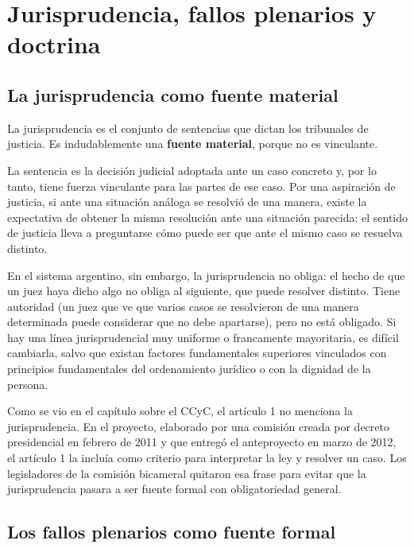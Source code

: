 \documentclass[12pt,oneside]{book}
\begin{document}
\chapter[Jurisprudencia, plenarios y doctrina]{Jurisprudencia, fallos plenarios y doctrina}

\section{La jurisprudencia como fuente material}

La jurisprudencia es el conjunto de sentencias que dictan los tribunales de justicia. Es indudablemente una \textbf{fuente material}, porque no es vinculante.

La sentencia es la decisión judicial adoptada ante un caso concreto y, por lo tanto, tiene fuerza vinculante para las partes de ese caso. Por una aspiración de justicia, si ante una situación análoga se resolvió de una manera, existe la expectativa de obtener la misma resolución ante una situación parecida: el sentido de justicia lleva a preguntarse cómo puede ser que ante el mismo caso se resuelva distinto.

En el sistema argentino, sin embargo, la jurisprudencia no obliga: el hecho de que un juez haya dicho algo no obliga al siguiente, que puede resolver distinto. Tiene autoridad (un juez que ve que varios casos se resolvieron de una manera determinada puede considerar que no debe apartarse), pero no está obligado. Si hay una línea jurisprudencial muy uniforme o francamente mayoritaria, es difícil cambiarla, salvo que existan factores fundamentales superiores vinculados con principios fundamentales del ordenamiento jurídico o con la dignidad de la persona.

Como se vio en el capítulo sobre el CCyC, el artículo 1 no menciona la jurisprudencia. En el proyecto, elaborado por una comisión creada por decreto presidencial en febrero de 2011 y que entregó el anteproyecto en marzo de 2012, el artículo 1 la incluía como criterio para interpretar la ley y resolver un caso. Los legisladores de la comisión bicameral quitaron esa frase para evitar que la jurisprudencia pasara a ser fuente formal con obligatoriedad general.

\section{Los fallos plenarios como fuente formal}
\end{document}
